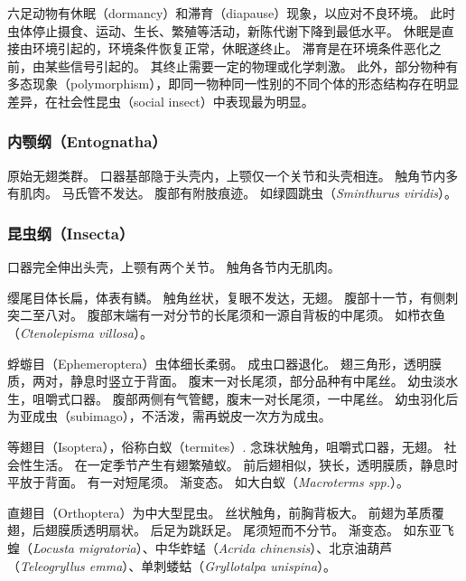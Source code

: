\documentclass[11pt]{article}
\begin{document}
\newline

六足动物有休眠（dormancy）和滞育（diapause）现象，以应对不良环境。
此时虫体停止摄食、运动、生长、繁殖等活动，新陈代谢下降到最低水平。
休眠是直接由环境引起的，环境条件恢复正常，休眠遂终止。
滞育是在环境条件恶化之前，由某些信号引起的。
其终止需要一定的物理或化学刺激。
此外，部分物种有多态现象（polymorphism），即同一物种同一性别的不同个体的形态结构存在明显差异，在社会性昆虫（social insect）中表现最为明显。

\subsubsection{内颚纲（Entognatha）}
原始无翅类群。
口器基部隐于头壳内，上颚仅一个关节和头壳相连。
触角节内多有肌肉。
马氏管不发达。
腹部有附肢痕迹。
如绿圆跳虫（\textit{Sminthurus viridis}）。

\subsubsection{昆虫纲（Insecta）}
口器完全伸出头壳，上颚有两个关节。
触角各节内无肌肉。

\newline

缨尾目体长扁，体表有鳞。
触角丝状，复眼不发达，无翅。
腹部十一节，有侧刺突二至八对。
腹部末端有一对分节的长尾须和一源自背板的中尾须。
如栉衣鱼（\textit{Ctenolepisma villosa}）。

\newline

蜉蝣目（Ephemeroptera）虫体细长柔弱。
成虫口器退化。
翅三角形，透明膜质，两对，静息时竖立于背面。
腹末一对长尾须，部分品种有中尾丝。
幼虫淡水生，咀嚼式口器。
腹部两侧有气管鳃，腹末一对长尾须，一中尾丝。
幼虫羽化后为亚成虫（subimago），不活泼，需再蜕皮一次方为成虫。

\newline

等翅目（Isoptera），俗称白蚁（termites）.
念珠状触角，咀嚼式口器，无翅。
社会性生活。
在一定季节产生有翅繁殖蚁。
前后翅相似，狭长，透明膜质，静息时平放于背面。
有一对短尾须。
渐变态。
如大白蚁（\textit{Macroterms spp.}）。

\newline

直翅目（Orthoptera）为中大型昆虫。
丝状触角，前胸背板大。
前翅为革质覆翅，后翅膜质透明扇状。
后足为跳跃足。
尾须短而不分节。
渐变态。
如东亚飞蝗（\textit{Locusta migratoria}）、中华蚱蜢（\textit{Acrida chinensis}）、北京油葫芦（\textit{Teleogryllus emma}）、单刺蝼蛄（\textit{Gryllotalpa unispina}）。
\end{document}
